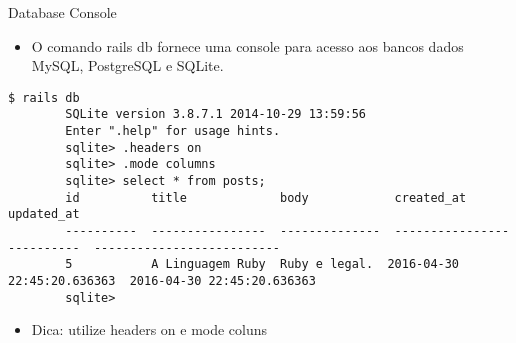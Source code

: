 
\begin{frame}[t, fragile]{Database Console}
	\begin{itemize}
		\item O comando \alert{rails db} fornece uma console para acesso aos bancos dados
		MySQL, PostgreSQL e SQLite.
	\end{itemize}
	
	\begin{lstlisting}[style=BashInputBasicStyle, basicstyle=\tiny\ttfamily,  keepspaces=true]
		$ rails db
		SQLite version 3.8.7.1 2014-10-29 13:59:56
		Enter ".help" for usage hints.
		sqlite> .headers on
		sqlite> .mode columns
		sqlite> select * from posts;
		id          title             body            created_at                  updated_at                
		----------  ----------------  --------------  --------------------------  --------------------------
		5           A Linguagem Ruby  Ruby e legal.  2016-04-30 22:45:20.636363  2016-04-30 22:45:20.636363
		sqlite> 
	\end{lstlisting}
	
	\begin{itemize}
		\item Dica: utilize \alert{headers on} e \alert{mode coluns}
	\end{itemize}
	
\end{frame}